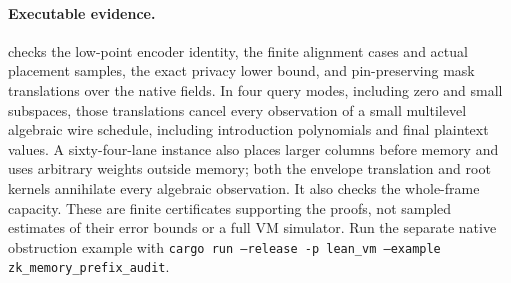 \paragraph{Executable evidence.}  checks the low-point encoder identity, the finite alignment cases and actual placement samples, the exact privacy lower bound, and pin-preserving mask translations over the native fields. In four query modes, including zero and small subspaces, those translations cancel every observation of a small multilevel algebraic wire schedule, including introduction polynomials and final plaintext values. A sixty-four-lane instance also places larger columns before memory and uses arbitrary weights outside memory; both the envelope translation and root kernels annihilate every algebraic observation. It also checks the whole-frame capacity. These are finite certificates supporting the proofs, not sampled estimates of their error bounds or a full VM simulator. Run the separate native obstruction example with \texttt{cargo run --release -p lean\_vm --example zk\_memory\_prefix\_audit}.
